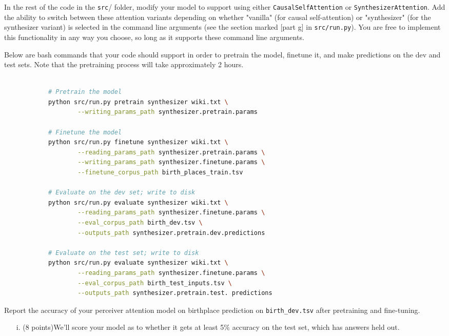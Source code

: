 \documentclass[letterpaper,12pt]{article}
\begin{document}
\begin{itemize}
		In the rest of the code in the \texttt{src}/ folder, modify your model to support using either \texttt{CausalSelfAttention} or \texttt{SynthesizerAttention}. Add the ability to switch between these attention variants depending on whether "vanilla" (for causal self-attention) or "synthesizer" (for the synthesizer variant) is selected in the command line arguments (see the section marked [part g] in \texttt{src/run.py}). You are free to implement this functionality in any way you choose, so long as it supports these command line arguments.
		
		Below are bash commands that your code should support in order to pretrain the model, finetune it, and make predictions on the dev and test sets.
		Note that the pretraining process will take approximately 2 hours. 
		\begin{lstlisting}[basicstyle=\ttfamily, language=bash]
			
			# Pretrain the model
			python src/run.py pretrain synthesizer wiki.txt \
					--writing_params_path synthesizer.pretrain.params
			
			# Finetune the model
			python src/run.py finetune synthesizer wiki.txt \
					--reading_params_path synthesizer.pretrain.params \
					--writing_params_path synthesizer.finetune.params \
					--finetune_corpus_path birth_places_train.tsv
			
			# Evaluate on the dev set; write to disk
			python src/run.py evaluate synthesizer wiki.txt \
					--reading_params_path synthesizer.finetune.params \
					--eval_corpus_path birth_dev.tsv \
					--outputs_path synthesizer.pretrain.dev.predictions
			
			# Evaluate on the test set; write to disk
			python src/run.py evaluate synthesizer wiki.txt \
					--reading_params_path synthesizer.finetune.params \
					--eval_corpus_path birth_test_inputs.tsv \
					--outputs_path synthesizer.pretrain.test. predictions
		\end{lstlisting}
		
		Report the accuracy of your perceiver attention model on birthplace prediction on \texttt{birth\_dev.tsv} after pretraining and fine-tuning.
		\begin{itemize}
		\item[i.]
			(8 points)We'll score your model as to whether it gets at least 5\% accuracy on the test set, which has answers held out.
			

\end{itemize}
\end{itemize}
\end{document}
